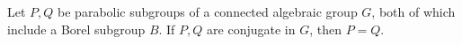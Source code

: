 Let $P, Q$ be parabolic subgroups of a connected algebraic group $G$, both of which include a Borel subgroup $B$. If $P, Q$ are conjugate in $G$, then $P = Q$.
